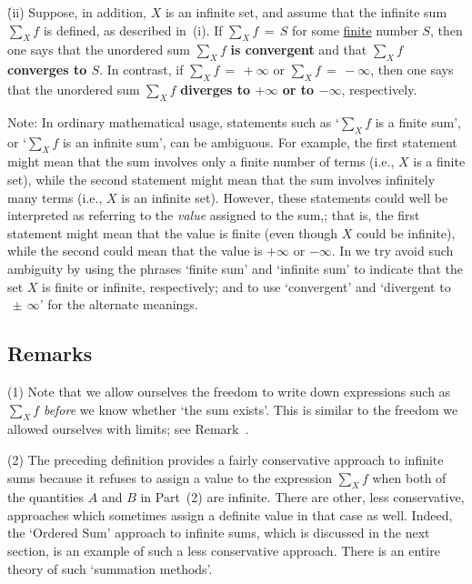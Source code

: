         \h (ii) Suppose, in addition, $X$ is an infinite set, and assume that the infinite sum ${\sum}_{X} f$ is defined, as described in~(i).
    If ${\sum}_{X} f \,=\, S$ for some \underline{finite} number $S$,
    then one says that the unordered sum ${\sum}_{X} f$ {\bf is convergent} and that ${\sum}_{X} f$ {\bf converges to $S$}.
    In contrast, if ${\sum}_{X} f \,=\, +{\infty}$ or ${\sum}_{X} f \,=\, -{\infty}$,
    then one says that the unordered sum ${\sum}_{X} f$ {\bf diverges to $+{\infty}$ or to $-{\infty}$}, respectively.

        Note: In ordinary mathematical usage, statements such as `${\sum}_{X} f$ is a finite sum', or `${\sum}_{X} f$ is an infinite sum', can be ambiguous.
    For example, the first statement might mean that the sum involves only a finite number of terms (i.e., $X$ is a finite set),
    while the second statement might mean that the sum involves infinitely many terms (i.e., $X$ is an infinite set).
    However, these statements could well be interpreted as referring to the {\em value} assigned to the sum,; that is, the first statement might mean that the value is finite (even though $X$ could be infinite), while the second could mean that the value is $+{\infty}$ or $-{\infty}$.
    In {\TheseNotes} we try avoid such ambiguity by using the phrases `finite sum' and `infinite sum' to indicate that the set $X$ is finite or infinite, respectively;
    and to use `convergent' and `divergent to $ \,{\pm}\, {\infty}$' for the alternate meanings.

\V
\V

            \subsection{\small{\bf Remarks}}
            \label{RemrkG20.30}

\hspace*{\parindent}(1) Note that we allow ourselves the freedom to write down expressions such as ${\sum}_{X} f$ {\em before} we know whether `the sum exists'.
    This is similar to the freedom we allowed ourselves with limits; see Remark~.

\V

        (2) The preceding definition provides a fairly conservative approach to infinite sums because it refuses to assign
    a value to the expression ${\sum}_{X} f$ when both of the quantities $A$ and $B$ in Part~(2) are infinite.
    There are other, less conservative, approaches which sometimes assign a definite value in that case as well.
    Indeed, the `Ordered Sum' approach to infinite sums, which is discussed in the next section, is an example of such a less conservative approach.
    There is an entire theory of such `summation methods'.

